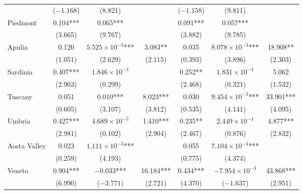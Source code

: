 \documentclass[12pt]{article}
\begin{document}
\begin{longtable}{@{}lcccccc@{}}
         & ($-1.168$) & (8.821) &  & ($-1.158$) & (9.811) &  \\ 
        Piedmont & 0.104*** & 0.065*** &  & 0.091*** & 0.057*** &  \\ 
         & (3.665) & (9.767) &  & (3.882) & (9.785) &  \\ 
        Apulia & 0.120 & $5.525 \times 10^{-3}$*** & 3.083** & 0.035 & $8.078 \times 10^{-3}$*** & 18.908** \\ 
         & (1.051) & (2.629) & (2.115) & (0.393) & (3.896) & (2.303) \\ 
        Sardinia & 0.407*** & $1.846 \times 10^{-3}$ &  & 0.252** & $1.831 \times 10^{-4}$ & 5.062 \\ 
         & (2.903) & (0.299) &  & (2.468) & (0.321) & (1.532) \\ 
        Tuscany & 0.051 & 0.010*** & 8.023*** & 0.030 & $9.454 \times 10^{-3}$*** & 33.901*** \\ 
         & (0.605) & (3.107) & (3.812) & (0.535) & (4.141) & (4.095) \\ 
        Umbria & 0.427*** & $4.689 \times 10^{-5}$ & 1.410*** & 0.235** & $2.449 \times 10^{-4}$ & 4.877*** \\ 
         & (2.981) & (0.102) & (2.904) & (2.467) & (0.876) & (2.832) \\ 
        Aosta Valley & 0.023 & $1.111 \times 10^{-3}$*** &  & 0.055 & $7.104 \times 10^{-4}$*** &  \\ 
         & (0.259) & (4.193) &  & (0.775) & (4.374) &  \\ 
        Veneto & 0.904*** & $-0.033$*** & 16.184*** & 0.434*** & $-7.954 \times 10^{-3}$ & 43.868*** \\
         & (6.990) & ($-3.771$) & (2.721) & (4.370) & ($-1.637$) & (2.951) \\* \bottomrule
	\end{longtable}
	
\end{document}
